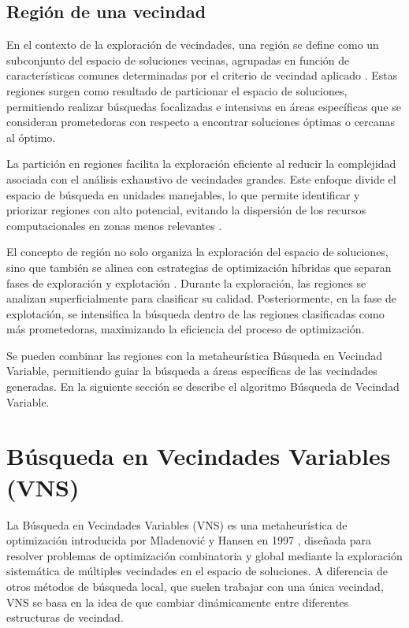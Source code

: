 \documentclass[12pt]{report}
\begin{document}
	\subsection{Región de una vecindad}
	\label{sec:Region de una vecindad}
	En el contexto de la exploración de vecindades, una región se define como un subconjunto del espacio de soluciones vecinas, agrupadas en función de características comunes determinadas por el criterio de vecindad aplicado \cite{ref6}. Estas regiones surgen como resultado de particionar el espacio de soluciones, permitiendo realizar búsquedas focalizadas e intensivas en áreas específicas que se consideran prometedoras con respecto a encontrar soluciones óptimas o cercanas al óptimo.

	La partición en regiones facilita la exploración eficiente al reducir la complejidad asociada con el análisis exhaustivo de vecindades grandes. Este enfoque divide el espacio de búsqueda en unidades manejables, lo que permite identificar y priorizar regiones con alto potencial, evitando la dispersión de los recursos computacionales en zonas menos relevantes \cite{ref6}.

	El concepto de región no solo organiza la exploración del espacio de soluciones, sino que también se alinea con estrategias de optimización híbridas que separan fases de exploración y explotación \cite{ref28}. Durante la exploración, las regiones se analizan superficialmente para clasificar su calidad. Posteriormente, en la fase de explotación, se intensifica la búsqueda dentro de las regiones clasificadas como más prometedoras, maximizando la eficiencia del proceso de optimización.

	Se pueden combinar las regiones con la metaheurística Búsqueda en Vecindad Variable, permitiendo guiar la búsqueda a áreas específicas de las vecindades generadas. En la siguiente sección se describe el algoritmo Búsqueda de Vecindad Variable.


	\section{Búsqueda en Vecindades Variables (VNS)}
	\label{sec:VNS}
	La Búsqueda en Vecindades Variables (VNS) es una metaheurística de optimización introducida por Mladenović y Hansen en 1997 \cite{ref14}, diseñada para resolver problemas de optimización combinatoria y global mediante la exploración sistemática de múltiples vecindades en el espacio de soluciones. A diferencia de otros métodos de búsqueda local, que suelen trabajar con una única vecindad, VNS se basa en la idea de que cambiar dinámicamente entre diferentes estructuras de vecindad.
\end{document}
